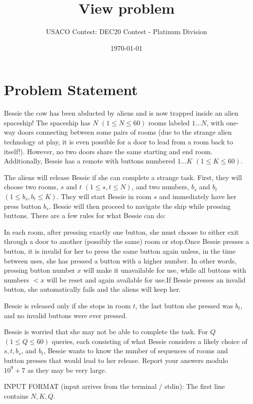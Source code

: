 \documentclass[12pt]{article}
\title{View problem}
\author{USACO Contest: DEC20 Contest - Platinum Division}
\date{\today}
\begin{document}
\maketitle

\section*{Problem Statement}

Bessie the cow has been abducted by aliens and is now trapped inside an alien
spaceship! The spaceship has $N$ $(1\le N\le 60)$ rooms labeled $1\ldots N$, with
one-way doors connecting between some pairs of rooms (due to the strange alien
technology at play, it is even possible for a door to lead from a room back to
itself!). However, no two doors share the same starting and end room.
Additionally, Bessie has a remote with buttons numbered $1\ldots K$
$(1 \le K \le 60)$.

The aliens will release Bessie if she can complete a strange task. First, they
will choose two rooms, $s$ and $t$ $(1 \le s, t \le N)$, and two numbers, $b_s$
and $b_t$ $(1 \le b_s, b_t \le K)$. They will start Bessie in room $s$ and
immediately have her press button $b_s$. Bessie will then proceed to navigate
the ship while pressing buttons. There are a few rules for what Bessie can do:

In each room, after pressing exactly one button, she must choose to either
exit through a door to another (possibly the same) room or stop.Once
Bessie presses a button, it is invalid for her to press the same button again
unless, in the time between uses, she has pressed a button with a higher number.
In other words, pressing button number $x$ will make it unavailable for use, 
while all buttons with numbers $<x$ will be reset and again available for
use.If Bessie presses an invalid button, she automatically fails and the aliens
will keep her.

Bessie is released only if she stops in room $t$, the last button she pressed
was $b_t$, and no invalid buttons were ever pressed.

Bessie is worried that she may not be able to complete the task. For $Q$
$(1\le Q\le 60)$ queries, each consisting of what Bessie considers a likely
choice of $s, t, b_s$, and $b_t$, Bessie wants to know the number of sequences
of rooms and button presses that would lead to her release. Report your answers
modulo $10^9 + 7$ as they may be very large.

INPUT FORMAT (input arrives from the terminal / stdin):
The first line contains $N,K,Q$.
\end{document}
